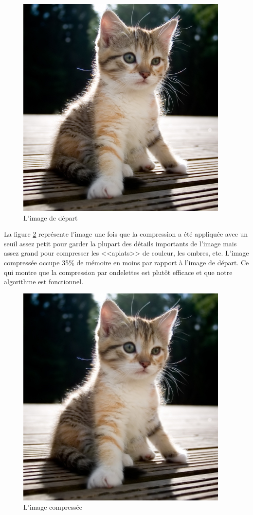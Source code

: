 \documentclass{article}
\begin{document}
\begin{figure}[!h]
\centering
\includegraphics[scale=1.9]{chat.jpg}
\caption{L'image de départ}
\label{chat1}
\end{figure}

La figure \ref{chat2} représente l'image une fois que la compression a été appliquée avec un seuil assez petit pour garder la plupart des détails importants de l'image mais assez grand pour compresser les <<aplats>> de couleur, les ombres, etc. L'image compressée occupe 35\% de mémoire en moins par rapport à l'image de départ. Ce qui montre que la compression par ondelettes est plutôt efficace et que notre algorithme est fonctionnel.

\begin{figure}[!h]
\centering
\includegraphics[scale=0.55]{chat_compress.jpg}
\caption{L'image compressée}
\label{chat2}
\end{figure}
\end{document}

